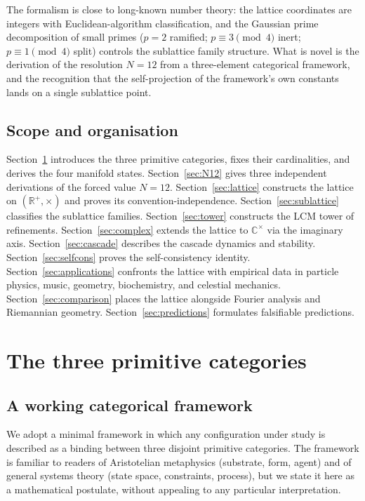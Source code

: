 \documentclass[11pt,a4paper]{article}
\theoremstyle{definition}
\theoremstyle{remark}
\newcommand{\R}{\mathbb{R}}
\newcommand{\C}{\mathbb{C}}
\begin{document}
The formalism is close to long-known number theory: the lattice coordinates are integers with Euclidean-algorithm classification, and the Gaussian prime decomposition of small primes ($p=2$ ramified; $p\equiv 3\pmod 4$ inert; $p\equiv 1\pmod 4$ split) controls the sublattice family structure. What is novel is the derivation of the resolution $N=12$ from a three-element categorical framework, and the recognition that the self-projection of the framework's own constants lands on a single sublattice point.

\subsection{Scope and organisation}

Section~\ref{sec:primitives} introduces the three primitive categories, fixes their cardinalities, and derives the four manifold states. Section~\ref{sec:N12} gives three independent derivations of the forced value $N=12$. Section~\ref{sec:lattice} constructs the lattice on $(\R^{+},\times)$ and proves its convention-independence. Section~\ref{sec:sublattice} classifies the sublattice families. Section~\ref{sec:tower} constructs the LCM tower of refinements. Section~\ref{sec:complex} extends the lattice to $\C^{\times}$ via the imaginary axis. Section~\ref{sec:cascade} describes the cascade dynamics and stability. Section~\ref{sec:selfcons} proves the self-consistency identity. Section~\ref{sec:applications} confronts the lattice with empirical data in particle physics, music, geometry, biochemistry, and celestial mechanics. Section~\ref{sec:comparison} places the lattice alongside Fourier analysis and Riemannian geometry. Section~\ref{sec:predictions} formulates falsifiable predictions.

\section{The three primitive categories}\label{sec:primitives}

\subsection{A working categorical framework}

We adopt a minimal framework in which any configuration under study is described as a binding between three disjoint primitive categories. The framework is familiar to readers of Aristotelian metaphysics (substrate, form, agent) and of general systems theory (state space, constraints, process), but we state it here as a mathematical postulate, without appealing to any particular interpretation.
\end{document}
